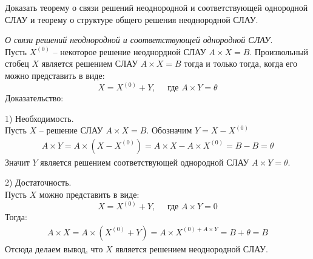 \begin{question}
  Доказать теорему о связи решений неоднородной и соответствующей однородной СЛАУ и теорему о структуре общего решения неоднородной СЛАУ.
\end{question} 
\begin{answer}
  \textit{О связи решений неоднородной и соответствующей однородной СЛАУ}. \\
  Пусть $X^{(0)}$ -- некоторое решение неоднордной СЛАУ $A \times X = B$. Произвольный стобец $X$ является решением СЛАУ $A \times X = B$ тогда и только тогда, когда его можно представить в виде:  \[
    X = X^{(0)} + Y, \quad \text{ где } A \times Y = \theta
  \] 
  Доказательство:

  1) Необходимость. \\
  Пусть $X$ -- решение СЛАУ $A \times X = B$. Обозначим $Y = X - X^{(0)}$
  \begin{gather*}
    A \times Y = A \times (X - X^{(0)}) = A \times X - A \times X^{(0)} = B - B = \theta
  \end{gather*}
  Значит $Y$ является решением соответствующей однородной СЛАУ  $A \times Y = \theta$.
  
  2) Достаточность. \\
  Пусть $X$ можно представить в виде:  \[
    X = X^{(0)} + Y, \quad \text{ где } A \times Y = 0
  \]
  Тогда:
  \begin{gather*}
  A \times X = A \times (X^{(0)} + Y) = A \times X^{(0) + A \times Y} = B + \theta = B
  \end{gather*}
  Отсюда делаем вывод, что $X$ является решением неоднородной СЛАУ.
\end{answer} 
\nobreakspace
